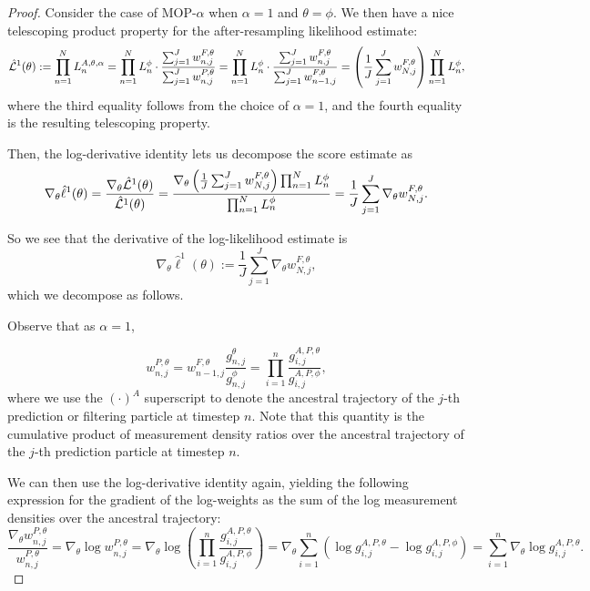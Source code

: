 \begin{proof}
    
Consider the case of MOP-$\alpha$ when $\alpha=1$ and $\theta=\phi$. We then have a nice telescoping product property for the after-resampling likelihood estimate:
\begin{equation*}
    \hat{\mathcal{L}}^1(\theta) := \prod_{n=1}^N L_n^{A, \theta, \alpha} = \prod_{n=1}^N L_n^\phi \cdot \frac{\sum_{j=1}^J w_{n,j}^{F,\theta}}{\sum_{j=1}^J w_{n,j}^{P,\theta}}= \prod_{n=1}^N L_n^\phi \cdot \frac{\sum_{j=1}^J w_{n,j}^{F,\theta}}{\sum_{j=1}^J w_{n-1,j}^{F,\theta}} = \left(\frac{1}{J}\sum_{j=1}^J w_{N,j}^{F,\theta}\right) \prod_{n=1}^N L_n^\phi,
\end{equation*}
where the third equality follows from the choice of $\alpha=1$, and the fourth equality is the resulting telescoping property. 

Then, the log-derivative identity lets us decompose the score estimate as
$$\nabla_\theta \hat\ell^1(\theta) = \frac{\nabla_\theta \hat{\mathcal{L}}^1(\theta)}{\hat{\mathcal{L}}^1(\theta)} = \frac{\nabla_\theta\left(\frac{1}{J}\sum_{j=1}^J w_{N,j}^{F,\theta}\right) \prod_{n=1}^N L_n^\phi}{\prod_{n=1}^N L_n^\phi} =  \frac{1}{J}\sum_{j=1}^J \nabla_\theta w_{N,j}^{F,\theta}.$$

So we see that the derivative of the log-likelihood estimate is
\begin{equation*}
    \nabla_\theta \hat{\ell}^1(\theta) := \frac{1}{J}\sum_{j=1}^J \nabla_\theta w_{N,j}^{F,\theta},
\end{equation*}
which we decompose as follows.

Observe that as $\alpha=1$,

$$w_{n,j}^{P,\theta} = w_{n-1,j}^{F,\theta}\frac{g_{n,j}^\theta}{g_{n,j}^\phi} = \prod_{i=1}^n \frac{g_{i,j}^{A,P,\theta}}{g_{i,j}^{A,P,\phi}},$$
where we use the $(\cdot)^A$ superscript to denote the ancestral trajectory of the $j$-th prediction or filtering particle at timestep $n$. Note that this quantity is the cumulative product of measurement density ratios over the ancestral trajectory of the $j$-th prediction particle at timestep $n$.

We can then use the log-derivative identity again, yielding the following expression for the gradient of the log-weights as the sum of the log measurement densities over the ancestral trajectory:
$$\frac{\nabla_\theta w_{n,j}^{P,\theta}}{w_{n,j}^{P,\theta}} = \nabla_\theta \log w_{n,j}^{P,\theta} = \nabla_\theta \log \left(\prod_{i=1}^n \frac{g_{i,j}^{A,P,\theta}}{g_{i,j}^{A,P,\phi}}\right) = \nabla_\theta \sum_{i=1}^n \left(\log g_{i,j}^{A,P,\theta} - \log g_{i,j}^{A,P,\phi}\right) = \sum_{i=1}^n \nabla_\theta \log g_{i,j}^{A,P,\theta}.$$


\end{proof}

